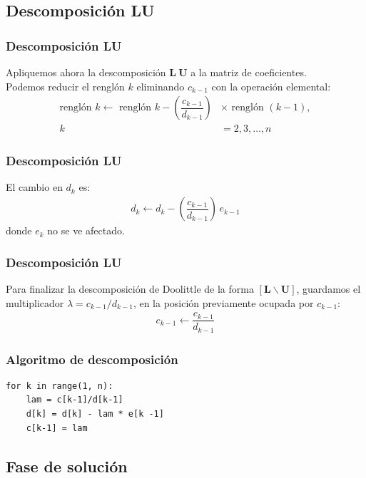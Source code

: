 \documentclass[12pt]{beamer}
\begin{document}
\subsection{Descomposición LU}

\begin{frame}
\frametitle{Descomposición LU}
Apliquemos ahora la descomposición $\mathbf{L\: U}$ a la matriz de coeficientes.
\\
\medskip
\pause
Podemos reducir el renglón $k$ eliminando $c_{k-1}$ con la operación elemental:
\pause
\begin{align*}
\mbox{renglón } k \leftarrow \mbox{ renglón } k - \left( \dfrac{c_{k-1}}{d_{k-1}} \right) &\times \mbox{ renglón } (k-1), \\
k &= 2, 3, \ldots, n
\end{align*}
\end{frame}
\begin{frame}
\frametitle{Descomposición LU}
El cambio en $d_{k}$ es:
\pause
\begin{align*}
d_{k} \leftarrow d_{k} - \left( \dfrac{c_{k-1}}{d_{k-1}} \right) \, e_{k-1}
\end{align*}
donde $e_{k}$ no se ve afectado.
\end{frame}
\begin{frame}
\frametitle{Descomposición LU}
Para finalizar la descomposición de Doolittle de la forma $[\mathbf{L} \backslash \mathbf{U}]$, \pause guardamos el multiplicador $\lambda = c_{k-1}/d_{k-1}$, en la posición previamente ocupada por $c_{k-1}$:
\pause
\begin{align*}
c_{k-1} \leftarrow \dfrac{c_{k-1}}{d_{k-1}}
\end{align*}
\end{frame}
\begin{frame}[fragile]
\frametitle{Algoritmo de descomposición}
\begin{lstlisting}[caption=Descomposición LU]
for k in range(1, n):
    lam = c[k-1]/d[k-1]
    d[k] = d[k] - lam * e[k -1]
    c[k-1] = lam
\end{lstlisting}
\end{frame}

\subsection{Fase de solución}
\end{document}
